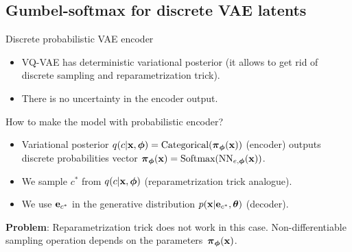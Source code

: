 \subsection{Gumbel-softmax for discrete VAE latents}
\begin{frame}{Discrete probabilistic VAE encoder}
	\begin{itemize}
		\item VQ-VAE has deterministic variational posterior (it allows to get rid of discrete sampling and reparametrization trick).
		\item There is no uncertainty in the encoder output. 
	\end{itemize}
	\begin{block}{How to make the model with probabilistic encoder?}
		\begin{itemize}
			\item Variational posterior $q(c | \mathbf{x}, \boldsymbol{\phi}) = \text{Categorical}(\boldsymbol{\pi}_{\boldsymbol{\phi}}(\mathbf{x}))$ (encoder) outputs discrete probabilities vector $\boldsymbol{\pi}_{\boldsymbol{\phi}}(\mathbf{x}) = \text{Softmax}(\text{NN}_{e, \boldsymbol{\phi}}(\mathbf{x}))$.
			\item We sample $c^*$ from $q(c | \mathbf{x}, \boldsymbol{\phi})$ (reparametrization trick analogue).
			\item We use $\mathbf{e}_{c^*}$ in the generative distribution $p(\mathbf{x} | \mathbf{e}_{c^*}, \boldsymbol{\theta})$ (decoder).
		\end{itemize}
	\end{block}
	\textbf{Problem}: Reparametrization trick does not work in this case. Non-differentiable sampling operation depends on the parameters~$\boldsymbol{\pi}_{\boldsymbol{\phi}}(\mathbf{x})$.
\end{frame}
